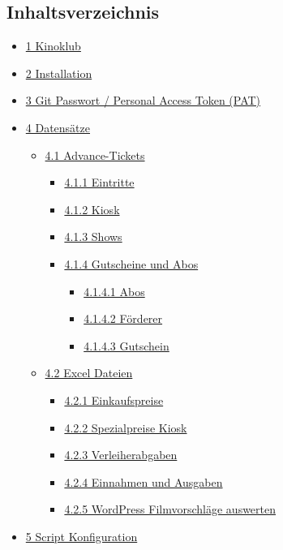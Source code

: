 \documentclass[
]{article}
\author{}
\date{\vspace{-2.5em}}
\providecommand{\tightlist}{%
  \setlength{\itemsep}{0pt}\setlength{\parskip}{0pt}}
\begin{document}
\subsection{Inhaltsverzeichnis}\label{inhaltsverzeichnis}

\begin{itemize}
\tightlist
\item
  \hyperref[A_1_Kinoklub]{1 Kinoklub}
\item
  \hyperref[A_2_Installation]{2 Installation}
\item
  \hyperref[A_3_Gitux5cux2520Passwortux5cux2520ux2fux5cux2520Personalux5cux2520Accessux5cux2520Tokenux5cux2520ux28PATux29]{3
  Git Passwort / Personal Access Token (PAT)}
\item
  \hyperref[A_4_Datensuxe4tze]{4 Datensätze}

  \begin{itemize}
  \tightlist
  \item
    \hyperref[A_4.1_Advance-Tickets]{4.1 Advance-Tickets}

    \begin{itemize}
    \tightlist
    \item
      \hyperref[A_4.1.1_Eintritte]{4.1.1 Eintritte}
    \item
      \hyperref[A_4.1.2_Kiosk]{4.1.2 Kiosk}
    \item
      \hyperref[A_4.1.3_Shows]{4.1.3 Shows}
    \item
      \hyperref[A_4.1.4_Gutscheineux5cux2520undux5cux2520Abos]{4.1.4
      Gutscheine und Abos}

      \begin{itemize}
      \tightlist
      \item
        \hyperref[A_4.1.4.1_Abos]{4.1.4.1 Abos}
      \item
        \hyperref[A_4.1.4.2_Fuxf6rderer]{4.1.4.2 Förderer}
      \item
        \hyperref[A_4.1.4.3_Gutschein]{4.1.4.3 Gutschein}
      \end{itemize}
    \end{itemize}
  \item
    \hyperref[A_4.2_Excelux5cux2520Dateien]{4.2 Excel Dateien}

    \begin{itemize}
    \tightlist
    \item
      \hyperref[A_4.2.1_Einkaufspreise]{4.2.1 Einkaufspreise}
    \item
      \hyperref[A_4.2.2_Spezialpreiseux5cux2520Kiosk]{4.2.2
      Spezialpreise Kiosk}
    \item
      \hyperref[A_4.2.3_Verleiherabgaben]{4.2.3 Verleiherabgaben}
    \item
      \hyperref[A_4.2.4_Einnahmenux5cux2520undux5cux2520Ausgaben]{4.2.4
      Einnahmen und Ausgaben}
    \item
      \hyperref[A_4.2.5_WordPressux5cux2520Filmvorschluxe4geux5cux2520auswerten]{4.2.5
      WordPress Filmvorschläge auswerten}
    \end{itemize}
  \end{itemize}
\item
  \hyperref[A_5_Scriptux5cux2520Konfiguration]{5 Script Konfiguration}


\end{itemize}
\end{document}
